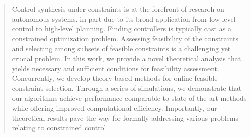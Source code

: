 \documentclass[letterpaper, 10 pt, conference]{ieeeconf}  %
\begin{document}
\begin{abstract}
\color{red}
Control synthesis under constraints is at the forefront of research on autonomous systems, in part due to its broad application from low-level control to high-level planning. Finding controllers is typically cast as a constrained optimization problem. Assessing feasibility of the constraints and selecting among subsets of feasible constraints is a challenging yet crucial problem. In this work, we provide a novel theoretical analysis that yields necessary and sufficient conditions for feasibility assessment. Concurrently, we develop theory-based methods for online feasible constraint selection. Through a series of simulations, we demonstrate that our algorithms achieve performance comparable to state-of-the-art methods while offering improved computational efficiency. Importantly, our theoretical results pave the way for formally addressing various problems relating to constrained control. 
\end{abstract}







%
\IEEEpeerreviewmaketitle
\end{document}
